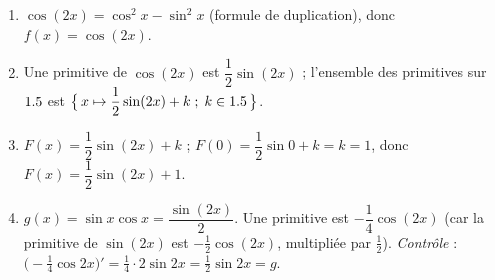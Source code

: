 \begin{enumerate}[label=\arabic*)]
\item $\cos(2x)=\cos^{2}x-\sin^{2}x$ (formule de duplication), donc $f(x)=\cos(2x)$.
\item Une primitive de $\cos(2x)$ est $\dfrac12\sin(2x)$ ; l'ensemble des primitives sur $1.5$ est
$\big\{\,x\mapsto\dfrac12\sin(2x)+k\;;\;k\in1.5\,\big\}$.
\item $F(x)=\dfrac12\sin(2x)+k$ ; $F(0)=\dfrac12\sin0+k=k=1$, donc $F(x)=\dfrac12\sin(2x)+1$.
\item $g(x)=\sin x\cos x=\dfrac{\sin(2x)}{2}$. Une primitive est $-\dfrac14\cos(2x)$
(car la primitive de $\sin(2x)$ est $-\frac12\cos(2x)$, multipliée par $\frac12$).
\emph{Contrôle} : $\big(-\tfrac14\cos2x\big)'=\tfrac14\cdot2\sin2x=\tfrac12\sin2x=g$. \checkmark
\end{enumerate}
